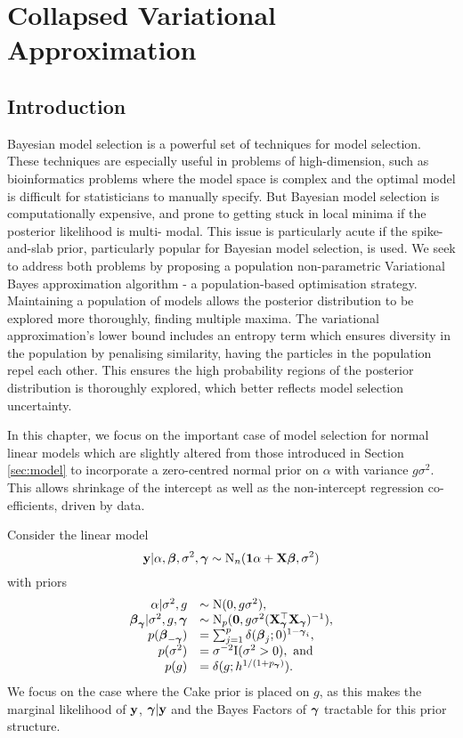 \chapter{Collapsed Variational Approximation}

\setlength{\parindent}{0pt}

\section{Introduction}

Bayesian model selection is a powerful set of techniques for model selection. These techniques are especially
useful in problems of high-dimension, such as bioinformatics problems where the model space is complex and the
optimal model is difficult for statisticians to manually specify. But Bayesian model selection is
computationally expensive, and prone to getting stuck in local minima if the posterior likelihood is multi-
modal. This issue is particularly acute if the spike-and-slab prior, particularly popular for Bayesian model
selection, is used. We seek to address both problems by proposing a population non-parametric Variational
Bayes approximation algorithm - a population-based optimisation strategy. Maintaining a population of models
allows the posterior distribution to be explored more thoroughly, finding multiple maxima. The variational
approximation's lower bound includes an entropy term which ensures diversity in the population by penalising
similarity,  having the particles in the population repel each other. This ensures the high probability
regions of the posterior distribution is thoroughly explored, which better reflects model selection
uncertainty.

In this chapter, we focus on the important case of model selection for normal linear models which
are slightly altered from those introduced in Section \ref{sec:model} to incorporate a zero-centred normal
prior on $\alpha$ with variance $g \sigma^2$. This allows shrinkage of the intercept as well as the
non-intercept regression co-efficients, driven by data.

Consider the linear model
$$
	{\bf y} | \alpha, {\boldsymbol \beta}, \sigma^2, {\boldsymbol \gamma} \sim \text{N}_n({\bf 1} \alpha + {\bf X} {\boldsymbol \beta}, \sigma^2)
$$
with priors
$$
\begin{array}{rl}
	\alpha | \sigma^2, g &\sim \text{N}(0, g \sigma^2), \\
	{\boldsymbol \beta}_{\boldsymbol \gamma} | \sigma^2, g, {\boldsymbol \gamma} &\sim \text{N}_p({\bf 0}, g \sigma^2 ({\bf X}_{\boldsymbol \gamma}^\top {\bf X}_{\boldsymbol \gamma})^{-1}), \\
	p({\boldsymbol \beta}_{-{\boldsymbol \gamma}}) &= \sum_{j=1}^p \delta({\boldsymbol \beta}_j; 0)^{1 - {\boldsymbol \gamma}_i}, \\
	p(\sigma^2) &= \sigma^{-2} \text{I}(\sigma^2 > 0), \text{ and } \\
	p(g) &= \delta(g; h^{1/(1 + p_{\boldsymbol \gamma})}).
\end{array}
$$
We focus on the case where the Cake prior is placed on $g$, as this makes the marginal likelihood of ${\bf y}$,
${\boldsymbol \gamma} | {\bf y}$ and the Bayes Factors of ${\boldsymbol \gamma}$ tractable for this prior structure.

